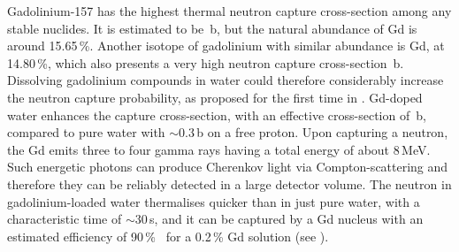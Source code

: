 Gadolinium-157 has the highest thermal neutron capture cross-section among any stable nuclides.
It is estimated to be \,b, but the natural abundance of Gd is around 15.65\,\%.
Another isotope of gadolinium with similar abundance is Gd, at 14.80\,\%, %
which also presents a very high neutron capture cross-section \,b.
Dissolving gadolinium compounds in water could therefore considerably increase the neutron capture %
probability, as proposed for the first time in .
Gd-doped water enhances the capture cross-section, with an effective cross-section of \,b, %
compared to pure water with $\sim$0.3\,b on a free proton.
Upon capturing a neutron, the Gd emits three to four gamma rays having a total energy of about 8\,MeV.
Such energetic photons can produce Cherenkov light via Compton-scattering and therefore they can be 
reliably detected in a large detector volume.
The neutron in gadolinium-loaded water thermalises quicker than in just pure water, with a %
characteristic time of $\sim$30\,\textmu s, and it can be captured by a Gd nucleus with an %
estimated efficiency of 90\,\%~\cite{Beacom:2003nk} for a 0.2\,\% Gd solution (see ).

